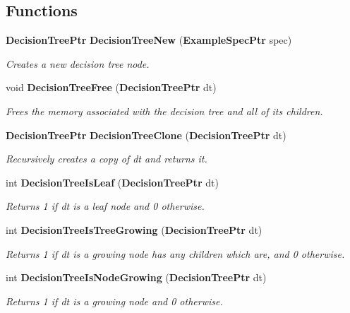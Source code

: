 \subsection*{Functions}
\begin{CompactItemize}
\item 
{\bf Decision\-Tree\-Ptr} {\bf Decision\-Tree\-New} ({\bf Example\-Spec\-Ptr} spec)
\begin{CompactList}\small\item\em Creates a new decision tree node. \item\end{CompactList}\item 
void {\bf Decision\-Tree\-Free} ({\bf Decision\-Tree\-Ptr} dt)
\begin{CompactList}\small\item\em Frees the memory associated with the decision tree and all of its children. \item\end{CompactList}\item 
{\bf Decision\-Tree\-Ptr} {\bf Decision\-Tree\-Clone} ({\bf Decision\-Tree\-Ptr} dt)
\begin{CompactList}\small\item\em Recursively creates a copy of dt and returns it. \item\end{CompactList}\item 
int {\bf Decision\-Tree\-Is\-Leaf} ({\bf Decision\-Tree\-Ptr} dt)
\begin{CompactList}\small\item\em Returns 1 if dt is a leaf node and 0 otherwise. \item\end{CompactList}\item 
int {\bf Decision\-Tree\-Is\-Tree\-Growing} ({\bf Decision\-Tree\-Ptr} dt)
\begin{CompactList}\small\item\em Returns 1 if dt is a growing node has any children which are, and 0 otherwise. \item\end{CompactList}\item 
int {\bf Decision\-Tree\-Is\-Node\-Growing} ({\bf Decision\-Tree\-Ptr} dt)
\begin{CompactList}\small\item\em Returns 1 if dt is a growing node and 0 otherwise. \item\end{CompactList}\item 

\end{CompactItemize}
